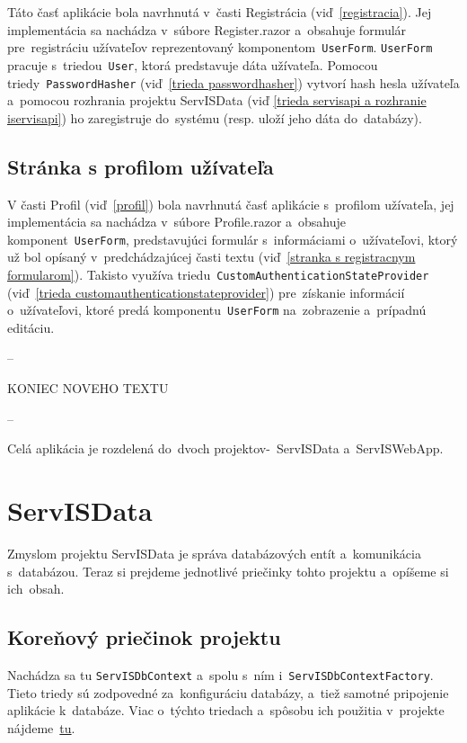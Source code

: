 Táto časť aplikácie bola navrhnutá v~časti Registrácia (viď~\ref{registracia}). Jej implementácia sa nachádza v~súbore Register.razor a~obsahuje formulár pre~registráciu užívateľov reprezentovaný komponentom~\verb|UserForm|. \verb|UserForm| pracuje s~triedou~\verb|User|, ktorá predstavuje dáta užívateľa. Pomocou triedy~\verb|PasswordHasher| (viď~\ref{trieda passwordhasher}) vytvorí hash hesla užívateľa a~pomocou rozhrania projektu ServISData (viď \ref{trieda servisapi a rozhranie iservisapi}) ho zaregistruje do~systému (resp. uloží jeho dáta do~databázy).

\subsection{Stránka s profilom užívateľa}

V časti Profil (viď~\ref{profil}) bola navrhnutá časť aplikácie s~profilom užívateľa, jej implementácia sa nachádza v~súbore Profile.razor a~obsahuje komponent~\verb|UserForm|, predstavujúci formulár s~informáciami o~užívateľovi, ktorý už bol opísaný v~predchádzajúcej časti textu (viď~\ref{stranka s registracnym formularom}). Takisto využíva triedu~\verb|CustomAuthenticationStateProvider| (viď~\ref{trieda customauthenticationstateprovider}) pre~získanie informácií o~užívateľovi, ktoré predá komponentu~\verb|UserForm| na~zobrazenie a~prípadnú editáciu.

\iffalse

--

KONIEC NOVEHO TEXTU

--

Celá aplikácia je rozdelená do~dvoch projektov-~ServISData a~ServISWebApp.

\section{ServISData}

Zmyslom projektu ServISData je správa databázových entít a~komunikácia s~databázou. Teraz si prejdeme jednotlivé priečinky tohto projektu a~opíšeme si ich~obsah.

\subsection{Koreňový priečinok projektu}

Nachádza sa tu \verb|ServISDbContext| a~spolu s~ním i~\verb|ServISDbContextFactory|. Tieto triedy sú zodpovedné za~konfiguráciu databázy, a~tiež samotné pripojenie aplikácie k~databáze. Viac o~týchto triedach a~spôsobu ich použitia v~projekte nájdeme~\href{https://learn.microsoft.com/en-us/ef/core/dbcontext-configuration/\#using-a-dbcontext-factory-eg-for-blazor}{tu}.

